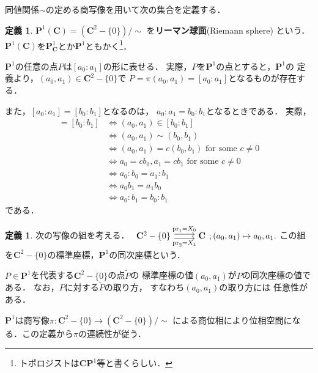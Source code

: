 \documentclass[11pt, a4paper, dvipdfmx, draft]{jsarticle}
\theoremstyle{definition}
\newtheorem{Definition}[Axiom]{定義}
\newcommand{\cc}{\mathbf{C}}
\newcommand{\pp}{\mathbf{P}}
\newcommand{\pr}{\mathop{\mathrm{pr}}\nolimits} %
\theoremstyle{mystyle}
\begin{document}
同値関係${\sim}$の定める商写像を用いて次の集合を定義する．

\begin{Definition}
    $\pp^{1}(\cc) = \left(\cc^{2}-\{0\}\right)/{\sim}$
    を\textbf{リーマン球面}(Riemann sphere) という．
    $\pp^{1}(\cc)$を$\pp^{1}_{\cc}$とか$\pp^{1}$ともかく\footnote{トポロジストは$\cc\pp^1$等と書くらしい．}．
\end{Definition}

$\pp^1$の任意の点$P$は$[a_0\colon a_1]$の形に表せる．
実際，$P$を$\pp^1$の点とすると，$\pp^1$の
定義より，$(a_{0},a_{1})\in \cc^{2}-\{0\}$で
$P=\pi(a_{0},a_{1})=[a_0\colon a_1]$となるものが存在する．

また，$[a_0\colon a_1]=[b_0\colon b_1]$となるのは，
$a_0\colon a_1=b_0\colon b_1$となるときである．
実際，
\begin{align*}
    [a_0\colon a_1]=[b_0\colon b_1]
    &\Longleftrightarrow
    (a_0, a_1)\in[b_0\colon b_1]\\
    &\Longleftrightarrow
    (a_0, a_1)\sim(b_0, b_1)\\
    &\Longleftrightarrow
    (a_0, a_1)=c(b_0, b_1) \text{ for some }c\neq0\\
    &\Longleftrightarrow
    a_0=cb_0, a_1=cb_1 \text{ for some }c\neq0\\    
    &\Longleftrightarrow
    a_0\colon b_0 = a_1 \colon b_1\\
    &\Longleftrightarrow
    a_0 b_1 = a_1 b_0\\
    &\Longleftrightarrow
    a_0\colon b_1 = b_0 \colon b_1
\end{align*}
である．

\begin{Definition}
    次の写像の組を考える．
    $\begin{tikzcd}
      {\cc^{2}-\{0\}}
        \arrow[r, shift left ,"\pr_1=X_0"]
        \arrow[r, shift right,"\pr_2=X_1"']
      & {\cc}
    \end{tikzcd}; (a_0,a_1)\mapsto a_0,a_1.$
    この組を$\cc^{2}-\{0\}$の標準座標，$\pp^1$の同次座標という．
\end{Definition}
$P\in\pp^1$を代表する$\cc^{2}-\{0\}$の点$\widetilde{P}$の
標準座標の値$(a_0,a_1)$が$P$の同次座標の値である．
なお，$P$に対する$\widetilde{P}$の取り方，
すなわち$(a_0,a_1)$の取り方には
任意性がある．

$\pp^{1}$は商写像$\pi \colon \cc^{2}-\{0\}
\longrightarrow\left(\cc^{2}-\{0\}\right)/{\sim}$
による商位相により位相空間になる．この定義から$\pi$の連続性が従う．
\end{document}
